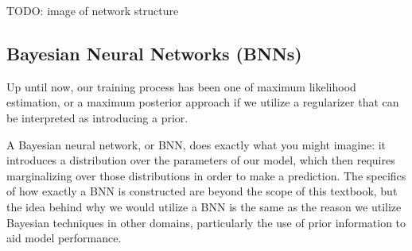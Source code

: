 TODO: image of network structure

\subsection{Bayesian Neural Networks (BNNs)}
Up until now, our training process has been one of maximum likelihood estimation, or a maximum posterior approach if we utilize a regularizer that can be interpreted as introducing a prior.

A Bayesian neural network, or BNN, does exactly what you might imagine: it introduces a distribution over the parameters of our model, which then requires marginalizing over those distributions in order to make a prediction. The specifics of how exactly a BNN is constructed are beyond the scope of this textbook, but the idea behind why we would utilize a BNN is the same as the reason we utilize Bayesian techniques in other domains, particularly the use of prior information to aid model performance.